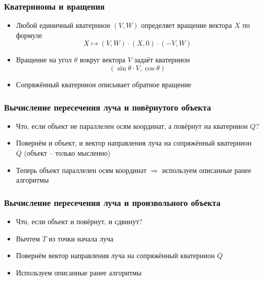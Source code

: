 \documentclass[10pt]{beamer}
\begin{document}
\begin{frame}
\frametitle{Кватернионы и вращения}
\begin{itemize}
\item Любой единичный кватернион \begin{math}(V,W)\end{math} определяет вращение вектора \begin{math}X\end{math} по формуле
\begin{equation}
X \mapsto (V, W) \cdot (X, 0) \cdot (-V, W)
\end{equation}
\pause
\item Вращение на угол \begin{math}\theta\end{math} вокруг вектора \begin{math}V\end{math} задаёт кватернион
\begin{equation}
(\sin\theta \cdot V, \cos\theta)
\end{equation}
\pause
\item Сопряжённый кватернион описывает обратное вращение
\end{itemize}
\end{frame}

\begin{frame}
\frametitle{Вычисление пересечения луча и повёрнутого объекта}
\begin{itemize}
\item Что, если объект не параллелен осям координат, а повёрнут на кватернион \begin{math}Q\end{math}?
\pause
\item Повернём и объект, и вектор направления луча на сопряжённый кватернион \begin{math}\overline{Q}\end{math} (объект -- только мысленно)
\pause
\item Теперь объект параллелен осям координат \begin{math}\Longrightarrow\end{math} используем описанные ранее алгоритмы
\end{itemize}
\end{frame}

\begin{frame}
\frametitle{Вычисление пересечения луча и произвольного объекта}
\begin{itemize}
\item Что, если объект и повёрнут, и сдвинут?
\pause
\item Вычтем \begin{math}T\end{math} из точки начала луча
\pause
\item Повернём вектор направления луча на сопряжённый кватернион \begin{math}\overline{Q}\end{math}
\pause
\item Используем описанные ранее алгоритмы
\end{itemize}
\end{frame}
\end{document}
